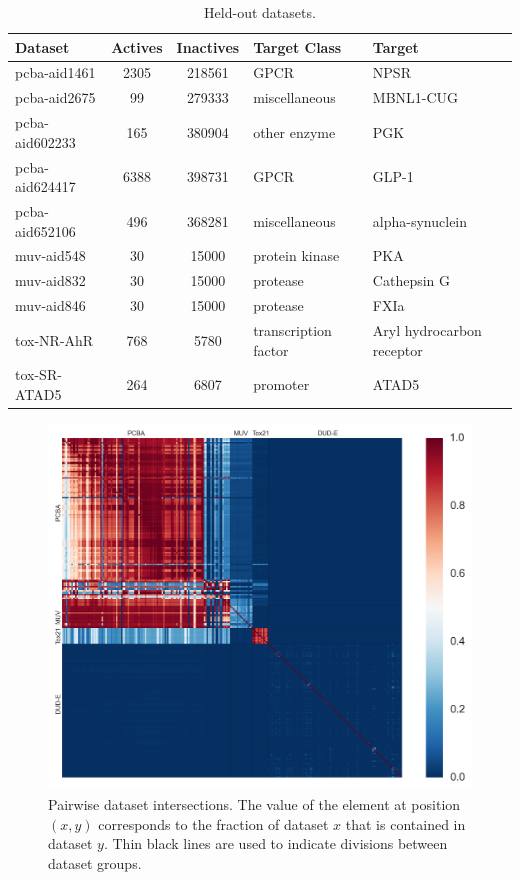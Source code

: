 \begin{table}[ht]
\centering
\caption{Held-out datasets.}
\label{tab:held-out}
\vskip 0.2in
\begin{tabular}{lSSll}
\toprule
\bfseries Dataset & \bfseries Actives & \bfseries Inactives & \bfseries Target Class & \bfseries Target \\
\midrule
pcba-aid1461 & 2305 & 218561 & GPCR & NPSR \\
pcba-aid2675 & 99 & 279333 & miscellaneous & MBNL1-CUG \\
pcba-aid602233 & 165 & 380904 & other enzyme & PGK \\
pcba-aid624417 & 6388 & 398731 & GPCR & GLP-1 \\
pcba-aid652106 & 496 & 368281 & miscellaneous & alpha-synuclein \\
muv-aid548 & 30 & 15000 & protein kinase & PKA \\
muv-aid832 & 30 & 15000 & protease & Cathepsin G \\
muv-aid846 & 30 & 15000 & protease & FXIa \\
tox-NR-AhR & 768 & 5780 & transcription factor & Aryl hydrocarbon receptor \\
tox-SR-ATAD5 & 264 & 6807 & promoter & ATAD5 \\
\bottomrule
\end{tabular}
\end{table}

\begin{figure}[ht]
\centering
\includegraphics[width=\linewidth]{Images/dataset_heatmap.png}
\caption{Pairwise dataset intersections. The value of the element at
  position $(x, y)$ corresponds to the fraction of dataset $x$ that is
  contained in dataset $y$. Thin black lines are used to indicate divisions
  between dataset groups.}
\label{fig:dataset_heatmap}
\end{figure}

